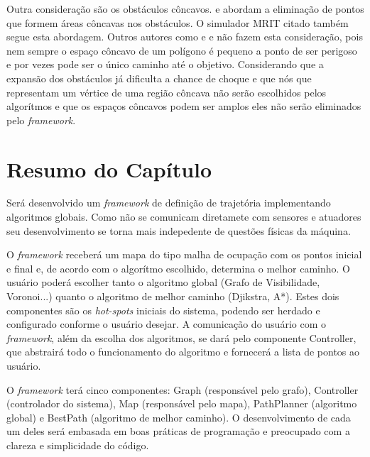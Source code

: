 Outra consideração são os obstáculos côncavos. \cite{Siegwart2004} e \cite{Guzman2008} abordam a eliminação de pontos que formem áreas côncavas nos obstáculos. O simulador MRIT citado também segue esta abordagem. Outros autores como \cite{Thomsen2010} e \cite{Choset2005} e  não fazem esta consideração, pois nem sempre o espaço côncavo de um polígono é pequeno a ponto de ser perigoso e por vezes pode ser o único caminho até o objetivo. Considerando que a expansão dos obstáculos já dificulta a chance de choque e que nós que representam um vértice de uma região côncava não serão escolhidos pelos algorítmos e que os espaços côncavos podem ser amplos eles não serão eliminados pelo \textit{framework}.

\section{Resumo do Capítulo}

Será desenvolvido um \textit{framework} de definição de trajetória implementando algoritmos globais. Como não se comunicam diretamete com sensores e atuadores seu desenvolvimento se torna mais indepedente de questões físicas da máquina.

O \textit{framework} receberá um mapa do tipo malha de ocupação com os pontos inicial e final e, de acordo com o algorítmo escolhido, determina o melhor caminho. O usuário poderá escolher tanto o algoritmo global (Grafo de Visibilidade, Voronoi...) quanto o algoritmo de melhor caminho (Djikstra, A*). Estes dois componentes são os \textit{hot-spots} iniciais do sistema, podendo ser herdado e configurado conforme o usuário desejar. A comunicação do usuário com o \textit{framework}, além da escolha dos algoritmos, se dará pelo componente Controller, que abstrairá todo o funcionamento do algoritmo e fornecerá a lista de pontos ao usuário.

O \textit{framework} terá cinco componentes: Graph (responsável pelo grafo), Controller (controlador do sistema), Map (responsável pelo mapa), PathPlanner (algoritmo global) e BestPath (algoritmo de melhor caminho). O desenvolvimento de cada um deles será embasada em boas práticas de programação e preocupado com a clareza e simplicidade do código.